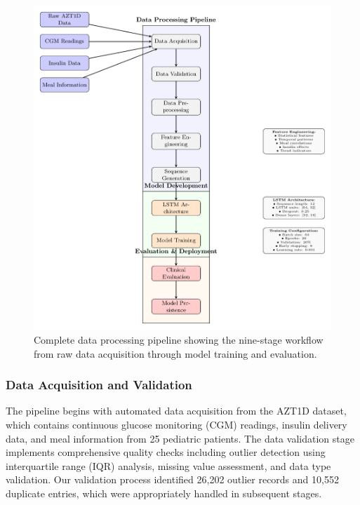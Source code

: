 \documentclass[acmsmall]{acmart}
\begin{document}
\begin{figure}[h]
  \centering
  \includegraphics[width=\linewidth]{pipeline_diagram}
  \caption{Complete data processing pipeline showing the nine-stage workflow from raw data acquisition through model training and evaluation.}
  \label{fig:pipeline}
\end{figure}

\subsubsection{Data Acquisition and Validation}

The pipeline begins with automated data acquisition from the AZT1D dataset, which contains continuous glucose monitoring (CGM) readings, insulin delivery data, and meal information from 25 pediatric patients. The data validation stage implements comprehensive quality checks including outlier detection using interquartile range (IQR) analysis, missing value assessment, and data type validation. Our validation process identified 26,202 outlier records and 10,552 duplicate entries, which were appropriately handled in subsequent stages.
\end{document}
